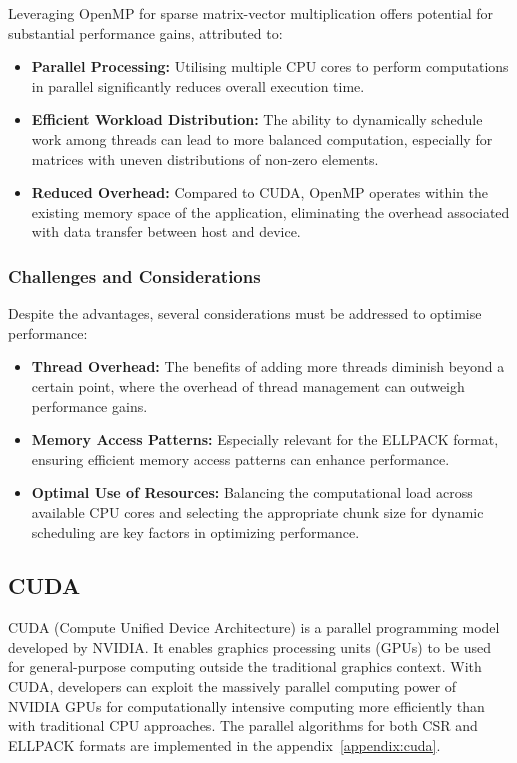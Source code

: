 \documentclass[12pt,oneside]{book} %
\begin{document}
Leveraging OpenMP for sparse matrix-vector multiplication offers potential for
substantial performance gains, attributed to:

\begin{itemize}
    \item \textbf{Parallel Processing:}  Utilising multiple CPU cores to perform computations in parallel significantly reduces overall execution time.
    \item \textbf{Efficient Workload Distribution:} The ability to dynamically schedule work among threads can lead to more balanced computation, especially for matrices with uneven distributions of non-zero elements.
    \item \textbf{Reduced Overhead:} Compared to CUDA, OpenMP operates within the existing memory space of the application, eliminating the overhead associated with data transfer between host and device.
\end{itemize}

\subsubsection{Challenges and Considerations}

Despite the advantages, several considerations must be addressed to optimise
performance:

\begin{itemize}
    \item \textbf{Thread Overhead:} The benefits of adding more threads diminish beyond a certain point, where the overhead of thread management can outweigh performance gains.

    \item \textbf{Memory Access Patterns:} Especially relevant for the ELLPACK format, ensuring efficient memory access patterns can enhance performance.

    \item \textbf{Optimal Use of Resources:} Balancing the computational load across available CPU cores and selecting the appropriate chunk size for dynamic scheduling are key factors in optimizing performance.
\end{itemize}

\newpage
\subsection{CUDA}

CUDA (Compute Unified Device Architecture) is a parallel programming model
developed by NVIDIA. It enables graphics processing units (GPUs) to be used for
general-purpose computing outside the traditional graphics context. With CUDA,
developers can exploit the massively parallel computing power of NVIDIA GPUs
for computationally intensive computing more efficiently than with traditional
CPU approaches. The parallel algorithms for both CSR and ELLPACK formats are
implemented in the appendix~\ref{appendix:cuda}.
\end{document}
